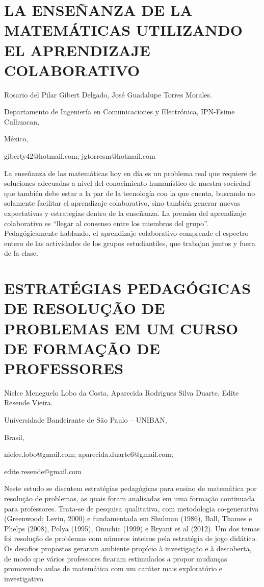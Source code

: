 \setcounter{section}{6}


\section{LA ENSEÑANZA DE LA MATEMÁTICAS UTILIZANDO EL APRENDIZAJE COLABORATIVO }

\begin{datos}

Rosario del Pilar Gibert Delgado, José Guadalupe Torres Morales.

Departamento de Ingeniería en Comunicaciones y Electrónica, IPN-Esime
Culhuacan,

México,

giberty42@hotmail.com; jgtorresm@hotmail.com

\end{datos}

La enseñanza de las matemáticas hoy en día es un problema real que
requiere de soluciones adecuadas a nivel del conocimiento humanístico
de nuestra sociedad que también debe estar a la par de la tecnología
con la que cuenta, buscando no solamente facilitar el aprendizaje
colaborativo, sino también generar nuevas expectativas y estrategias
dentro de la enseñanza. La premisa del aprendizaje colaborativo es
“llegar al consenso entre los miembros del grupo”. Pedagógicamente
hablando, el aprendizaje colaborativo comprende el espectro entero
de las actividades de los grupos estudiantiles, que trabajan juntos
y fuera de la clase.


\section{ESTRATÉGIAS PEDAGÓGICAS DE RESOLUÇÃO DE PROBLEMAS EM UM CURSO DE
FORMAÇÃO DE PROFESSORES}

\begin{datos}

Nielce Meneguelo Lobo da Costa, Aparecida Rodrigues Silva Duarte,
Edite Resende Vieira.

Universidade Bandeirante de São Paulo – UNIBAN,

Brasil,

nielce.lobo@gmail.com; aparecida.duarte6@gmail.com;

edite.resende@gmail.com

\end{datos}

Neste estudo se discutem estratégias pedagógicas para ensino de matemática
por resolução de problemas, as quais foram analisadas em uma formação
continuada para professores. Trata-se de pesquisa qualitativa, com
metodologia co-generativa (Greenwood; Levin, 2000) e fundamentada
em Shulman (1986), Ball, Thames e Phelps (2008), Polya (1995), Onuchic
(1999) e Bryant et al (2012). Um dos temas foi resolução de problemas
com números inteiros pela estratégia de jogo didático. Os desafios
propostos geraram ambiente propício à investigação e à descoberta,
de modo que vários professores ficaram estimulados a propor mudanças
promovendo aulas de matemática com um caráter mais exploratório e
investigativo. 


